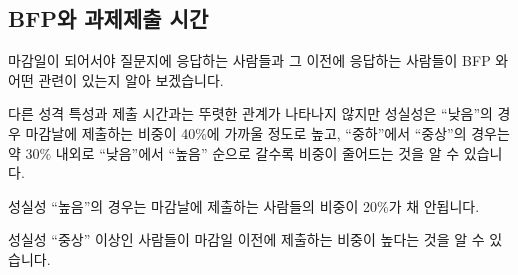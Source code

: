 \documentclass[
]{book}
\begin{document}
\subsection{BFP와 과제제출 시간}\label{bfpuxc640-uxacfcuxc81cuxc81cuxcd9c-uxc2dcuxac04}

마감일이 되어서야 질문지에 응답하는 사람들과 그 이전에 응답하는 사람들이 BFP 와 어떤 관련이 있는지 알아 보겠습니다.

다른 성격 특성과 제출 시간과는 뚜렷한 관계가 나타나지 않지만 성실성은 ``낮음''의 경우 마감날에 제출하는 비중이 40\%에 가까울 정도로 높고, ``중하''에서 ``중상''의 경우는 약 30\% 내외로 ``낮음''에서 ``높음'' 순으로 갈수록 비중이 줄어드는 것을 알 수 있습니다.

성실성 ``높음''의 경우는 마감날에 제출하는 사람들의 비중이 20\%가 채 안됩니다.

성실성 ``중상'' 이상인 사람들이 마감일 이전에 제출하는 비중이 높다는 것을 알 수 있습니다.
\end{document}

